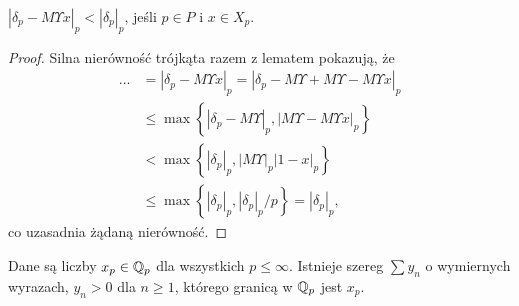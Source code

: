 \begin{wniosek}[V]
	$|\delta_p - M \Upsilon x|_p < |\delta_p|_p$, jeśli $p \in P$ i $x \in X_p$. 
\end{wniosek}

\begin{proof}
	Silna nierówność trójkąta razem z lematem pokazują, że
	\begin{align*}
	\dots & = |\delta_p - M \Upsilon x|_p = |\delta_p - M \Upsilon +M \Upsilon - M \Upsilon x|_p \\
	& \le \max \left\{|\delta_p - M \Upsilon |_p, |M \Upsilon - M \Upsilon x|_p\right\} \\
	& < \max\left\{|\delta_p|_p, |M \Upsilon|_p |1-x|_p\right\} \\
	& \le \max\left\{|\delta_p|_p, |\delta_p|_p / p\right\} = |\delta_p|_p,
	\end{align*}
	co uzasadnia żądaną nierówność.
\end{proof}

\begin{twierdzenie}
	Dane są liczby $x_p \in \mathbb Q_p$ dla wszystkich $p \le \infty$.
	Istnieje szereg $\sum y_n$ o wymiernych wyrazach, $y_n > 0$ dla $n \ge 1$, którego granicą w $\mathbb Q_p$ jest $x_p$.
\end{twierdzenie}

